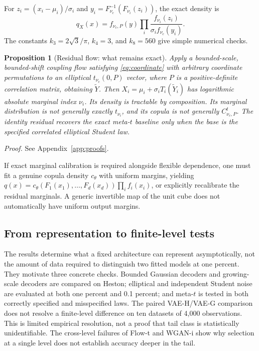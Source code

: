\documentclass[11pt]{article}
\newtheorem{proposition}[theorem]{Proposition}
\theoremstyle{definition}\newtheorem{definition}[theorem]{Definition}
\theoremstyle{remark}\newtheorem{remark}[theorem]{Remark}
\begin{document}
For $z_i=(x_i-\mu_i)/\sigma_i$ and $y_i=F_{\nu_c}^{-1}(F_{\nu_i}(z_i))$, the exact density is
\begin{equation}\label{eq:meta-density}
q_X(x)=f_{\nu_c,P}(y)\prod_i\frac{f_{\nu_i}(z_i)}{\sigma_i f_{\nu_c}(y_i)}.
\end{equation}
The constants $k_3=2\sqrt3/\pi$, $k_4=3$, and $k_8=560$ give simple numerical checks.

\begin{proposition}[Residual flow: what remains exact]\label{prop:residual}
Apply a bounded-scale, bounded-shift coupling flow satisfying \eqref{eq:coordinate} with arbitrary coordinate permutations to an elliptical $t_{\nu_c}(0,P)$ vector, where $P$ is a positive-definite correlation matrix, obtaining $\widetilde Y$. Then $X_i=\mu_i+\sigma_iT_i(\widetilde Y_i)$ has logarithmic absolute marginal index $\nu_i$. Its density is tractable by composition. Its marginal distribution is not generally exactly $t_{\nu_i}$, and its copula is not generally $C^t_{\nu_c,P}$. The identity residual recovers the exact meta-$t$ baseline only when the base is the specified correlated elliptical Student law.
\end{proposition}
\noindent\emph{Proof.} See Appendix~\ref{app:proofs}.\par

If exact marginal calibration is required alongside flexible dependence, one must fit a genuine copula density $c_\theta$ with uniform margins, yielding $q(x)=c_\theta(F_1(x_1),\ldots,F_d(x_d))\prod_i f_i(x_i)$, or explicitly recalibrate the residual marginals. A generic invertible map of the unit cube does not automatically have uniform output margins.


\subsection{From representation to finite-level tests}\label{sec:theory-bridge}
The results determine what a fixed architecture can represent asymptotically, not the amount of data required to distinguish two fitted models at one percent. They motivate three concrete checks. Bounded Gaussian decoders and growing-scale decoders are compared on Heston; elliptical and independent Student noise are evaluated at both one percent and 0.1 percent; and meta-$t$ is tested in both correctly specified and misspecified laws. The paired VAE-H/VAE-G comparison does not resolve a finite-level difference on ten datasets of 4,000 observations. This is limited empirical resolution, not a proof that tail class is statistically unidentifiable. The cross-level failures of Flow-t and WGAN-i show why selection at a single level does not establish accuracy deeper in the tail.
\end{document}

